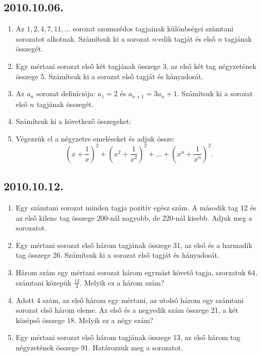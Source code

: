 \subsection*{2010.10.06.}
\begin{enumerate}
\item Az $1,2,4,7,11,\ldots$ sorozat szomszédos tagjainak különbségei számtani sorozatot alkotnak. Számítsuk ki a sorozat $n$-edik tagját és első $n$ tagjának összegét.
\item Egy mértani sorozat első két tagjának összege 3, az első két tag négyzetének összege 5. Számítsuk ki a sorozat első tagját és hányadosát.
\item Az $a_n$ sorozat definíciója: $a_1=2$ és 
$a_{n+1}=3a_n+1$. Számítsuk ki a sorozat első $n$ tagjának összegét.
\item Számítsuk ki a következő összegeket:
\item Végezzük el a négyzetre emeléseket és adjuk össze:
$$
\left(x+\frac{1}{x}\right)^2+
\left(x^2+\frac{1}{x^2}\right)^2+
\ldots
+\left(x^n+\frac{1}{x^n}\right)^2.
$$
\end{enumerate}


\subsection*{2010.10.12.}
\begin{enumerate}
\item Egy számtani sorozat minden tagja pozitív egész szám. A második tag 12 és az első kilenc tag összege 200-nál nagyobb, de 220-nál kisebb. Adjuk meg a sorozatot.
\item Egy mértani sorozat első három tagjának összege 31, az első és a harmadik tag összege 26. Számítsuk ki a sorozat első tagját és hányadosát.
\item Három szám egy mértani sorozat három egymást követő tagja, szorzatuk 64, számtani közepük $\frac{14}{3}$. Melyik ez a három szám?
\item Adott 4 szám, az első három egy mértani, az utolsó három egy számtani sorozat első három eleme. Az első és a negyedik szám összege 21, a két középső összege 18. Melyik ez a négy szám?
\item Egy mértani sorozat első három tagjának összege 13, az első három tag négyzetének összege 91. Határozzuk meg a sorozatot.
\end{enumerate}


